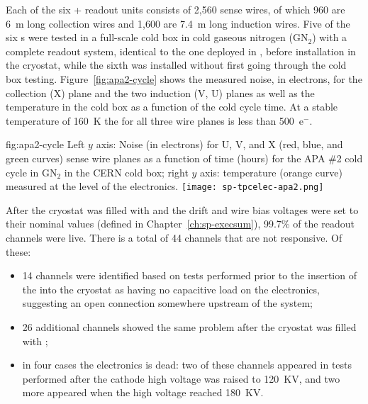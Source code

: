 Each of the six  +
readout units consists of 2,560 sense wires, of which 960 are \SI{6}{m} 
long collection wires and 1,600 are \SI{7.4}{m} long induction wires. 
Five of the six s were tested in a full-scale cold box in 
cold gaseous nitrogen (GN$_2$) with a complete  readout system,  
identical to the one %
deployed in , before installation in the cryostat,
while the sixth %
 was installed without first going through the cold
box testing. Figure~\ref{fig:apa2-cycle} shows the measured noise, in 
electrons, for the collection (X) plane and the two induction (V, U) 
planes as well as the  temperature in the cold box as a 
function of the cold cycle time. At a stable temperature of 
\SI{160}{K} the  for all three wire planes is less than 500~e$^-$.

\begin{dunefigure}
{fig:apa2-cycle}
{Left $y$ axis: Noise (in electrons) for U, V, and X (red, blue, and green 
curves) sense wire planes as a function of time (hours) for the APA \#2 cold 
cycle in GN$_2$ in the CERN cold box; right $y$ axis: temperature 
(orange curve) measured at the level of the  electronics.}
\texttt{[image: sp-tpcelec-apa2.png]}
\end{dunefigure}
After the cryostat was filled with  and the drift and wire 
bias voltages were set to their nominal values (defined in Chapter~\ref{ch:sp-execsum}), 
99.7\% of the  readout channels were live.
There is a total of 44 channels that are not responsive. Of these:
\begin{itemize}
\item{14 channels were identified based on tests performed prior
to the insertion of the  into the cryostat as having
no capacitive load on the  electronics, suggesting an open 
connection somewhere upstream  of the  system;}
\item{26 additional channels showed the same problem after the
cryostat was filled with ;}
\item{in four cases the  electronics is dead: two of these
channels appeared in tests performed after the cathode high
voltage was raised to \SI{120}{KV}, and two more
appeared when the high voltage reached \SI{180}{KV}.}
\end{itemize}

